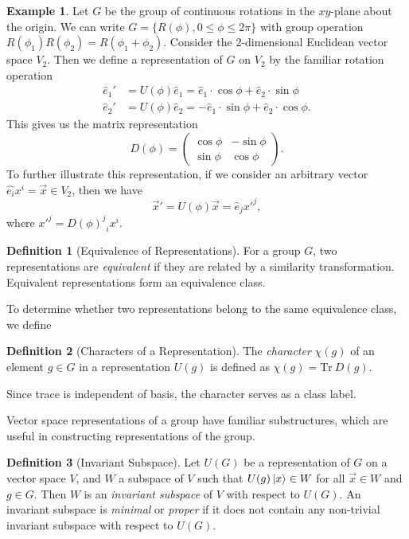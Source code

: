 \documentclass[12pt]{report}
\theoremstyle{definition}
\newtheorem{definition}{Definition}[chapter]
\newtheorem{example}{Example}[chapter]
\begin{document}
\begin{example}
    Let $G$ be the group of continuous rotations in the $xy$-plane about the origin. We can write $G = \{R(\phi),0\leq\phi\leq2\pi\}$ with group operation $R(\phi_1)R(\phi_2) = R(\phi_1+\phi_2)$. Consider the 2-dimensional Euclidean vector space $V_2$. Then we define a representation of $G$ on $V_2$ by the familiar rotation operation
    \begin{align}
        \hat{e}_1' &= U(\phi)\hat{e}_1 = \hat{e}_1\cdot\cos\phi + \hat{e}_2\cdot\sin\phi\\
        \hat{e}_2' &= U(\phi)\hat{e}_2 = -\hat{e}_1\cdot\sin\phi + \hat{e}_2\cdot\cos\phi.
    \end{align}
This gives us the matrix representation
\begin{equation}
    D(\phi) = \begin{pmatrix}
        \cos\phi & -\sin\phi\\
        \sin\phi & \cos\phi
    \end{pmatrix}.
\end{equation}
To further illustrate this representation, if we consider an arbitrary vector $\hat{e_i}x^i=\vec{x}\in V_2$, then we have
\begin{equation}
    \vec{x}' = U(\phi)\vec{x} = \hat{e}_j{x'}^j,
\end{equation}
where ${x'}^j = {{D(\phi)}^j}_i x^i$.
\end{example}

\begin{definition}[Equivalence of Representations]
    For a group $G$, two representations are \textit{equivalent} if they are related by a similarity transformation. Equivalent representations form an equivalence class.
\end{definition}

To determine whether two representations belong to the same equivalence class, we define
\begin{definition}[Characters of a Representation]
    The \textit{character} $\chi(g)$ of an element $g\in G$ in a representation $U(g)$ is defined as $\chi(g) = \text{Tr}~D(g)$.
\end{definition}
Since trace is independent of basis, the character serves as a class label.

Vector space representations of a group have familiar substructures, which are useful in constructing representations of the group.
\begin{definition}[Invariant Subspace]
    Let $U(G)$ be a representation of $G$ on a vector space $V$, and $W$ a subspace of $V$ such that $U(g)\ket{x}\in W$ for all $\vec{x}\in W$ and $g\in G$. Then $W$ is an \textit{invariant subspace} of $V$ with respect to $U(G)$. An invariant subspace is \textit{minimal} or \textit{proper} if it does not contain any non-trivial invariant subspace with respect to $U(G)$.
\end{definition}
\end{document}

